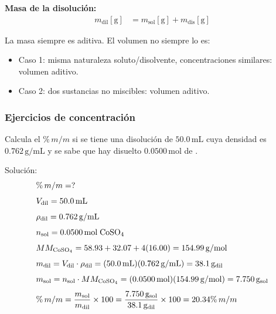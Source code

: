 \textbf{Masa de la disolución:}
\begin{align*}
    m_{\mathrm{dil}}[\mathrm{g}] &= m_{\mathrm{sol}}[\mathrm{g}] + m_{\mathrm{dis}}[\mathrm{g}]
\end{align*}

La masa siempre es aditiva. El volumen no siempre lo es:
\begin{itemize}
    \item Caso 1: misma naturaleza soluto/disolvente, concentraciones similares: volumen aditivo.
    \item Caso 2: dos sustancias no miscibles: volumen aditivo.
\end{itemize}

{}
\subsubsection*{\textcolor{blueunam}{Ejercicios de concentración}}

\begin{exercise}{}{}
Calcula el $\%\,m/m$ si se tiene una disolución de $50.0\,\mathrm{mL}$ cuya densidad es $0.762\,\mathrm{g/mL}$ y se sabe que hay disuelto $0.0500\,\mathrm{mol}$ de .

Solución:
\begin{align*}
    &\%\,m/m = ? \\[4pt]
    &V_{\mathrm{dil}} = 50.0\,\mathrm{mL} \\[4pt]
    &\rho_{\mathrm{dil}} = 0.762\,\mathrm{g/mL} \\[4pt]
    &n_{\mathrm{sol}} = 0.0500\,\mathrm{mol}\;\ce{CoSO4} \\[4pt]
    &MM_{\mathrm{CoSO_4}} = 58.93 + 32.07 + 4(16.00) = 154.99\,\mathrm{g/mol} \\[4pt]
    &m_{\mathrm{dil}} = V_{\mathrm{dil}} \cdot \rho_{\mathrm{dil}}
        = (50.0\,\mathrm{mL})(0.762\,\mathrm{g/mL})
        = 38.1\,\mathrm{g}_{\mathrm{dil}} \\[4pt]
    &m_{\mathrm{sol}} = n_{\mathrm{sol}} \cdot MM_{\mathrm{CoSO_4}}
        = (0.0500\,\mathrm{mol})(154.99\,\mathrm{g/mol})
        = 7.750\,\mathrm{g}_{\mathrm{sol}} \\[4pt]
    &\%\,m/m = \frac{m_{\mathrm{sol}}}{m_{\mathrm{dil}}} \times 100
        = \frac{7.750\,\mathrm{g}_{\mathrm{sol}}}{38.1\,\mathrm{g}_{\mathrm{dil}}} \times 100
        = 20.34\%\,m/m
\end{align*}
\end{exercise}


